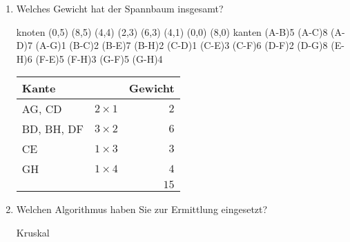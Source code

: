 \documentclass{lehramt-informatik}
\begin{document}
\begin{enumerate}
\item Welches Gewicht hat der Spannbaum insgesamt?

\begin{antwort}
\graph knoten {
  (0,5)
  (8,5)
  (4,4)
  (2,3)
  (6,3)
  (4,1)
  (0,0)
  (8,0)
} kanten {
  \kante(A-B){5}
  \kante(A-C){8}
  \kante(A-D){7}
  \KANTE(A-G){1}
  \KANTE(B-C){2}
  \kante(B-E){7}
  \KANTE(B-H){2}
  \KANTE(C-D){1}
  \KANTE(C-E){3}
  \kante(C-F){6}
  \KANTE(D-F){2}
  \kante(D-G){8}
  \kante(E-H){6}
  \kante(F-E){5}
  \kante(F-H){3}
  \kante(G-F){5}
  \KANTE(G-H){4}
}

\begin{center}
\begin{tabular}{|l|l|r|}
\hline
Kante & & Gewicht\\\hline\hline
AG, CD     & $2 \times 1$ & $2$\\
BD, BH, DF & $3 \times 2$ & $6$\\
CE         & $1 \times 3$ & $3$\\
GH         & $1 \times 4$ & $4$\\\hline
           &              & $15$\\\hline
\end{tabular}
\end{center}
\end{antwort}

\item Welchen Algorithmus haben Sie zur Ermittlung eingesetzt?

\begin{antwort}
Kruskal
\end{antwort}
\end{enumerate}

\literatur
\end{document}
